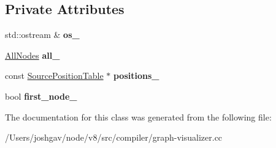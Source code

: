 \subsection*{Private Attributes}
\begin{DoxyCompactItemize}
\item 
std\+::ostream \& {\bfseries os\+\_\+}\hypertarget{classv8_1_1internal_1_1compiler_1_1_j_s_o_n_graph_node_writer_ae1e7dbf63f8a6c938671b4bea7be18ad}{}\label{classv8_1_1internal_1_1compiler_1_1_j_s_o_n_graph_node_writer_ae1e7dbf63f8a6c938671b4bea7be18ad}

\item 
\hyperlink{classv8_1_1internal_1_1compiler_1_1_all_nodes}{All\+Nodes} {\bfseries all\+\_\+}\hypertarget{classv8_1_1internal_1_1compiler_1_1_j_s_o_n_graph_node_writer_aa21cf7f4089686636cebe30d3832ba2f}{}\label{classv8_1_1internal_1_1compiler_1_1_j_s_o_n_graph_node_writer_aa21cf7f4089686636cebe30d3832ba2f}

\item 
const \hyperlink{classv8_1_1internal_1_1compiler_1_1_source_position_table}{Source\+Position\+Table} $\ast$ {\bfseries positions\+\_\+}\hypertarget{classv8_1_1internal_1_1compiler_1_1_j_s_o_n_graph_node_writer_a850bb17b495b8728719d0f86b4c0ca1b}{}\label{classv8_1_1internal_1_1compiler_1_1_j_s_o_n_graph_node_writer_a850bb17b495b8728719d0f86b4c0ca1b}

\item 
bool {\bfseries first\+\_\+node\+\_\+}\hypertarget{classv8_1_1internal_1_1compiler_1_1_j_s_o_n_graph_node_writer_ac069f9b9676de886ce0a0157a1412793}{}\label{classv8_1_1internal_1_1compiler_1_1_j_s_o_n_graph_node_writer_ac069f9b9676de886ce0a0157a1412793}

\end{DoxyCompactItemize}


The documentation for this class was generated from the following file\+:\begin{DoxyCompactItemize}
\item 
/\+Users/joshgav/node/v8/src/compiler/graph-\/visualizer.\+cc\end{DoxyCompactItemize}
